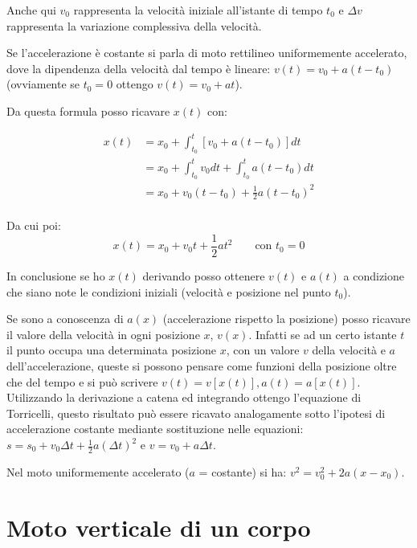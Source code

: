 \documentclass[class=book, crop=false, oneside, 12pt]{standalone}
\begin{document}
Anche qui \(v_0\) rappresenta la velocità iniziale all'istante di tempo
\(t_0\) e \(\Delta v\) rappresenta la variazione complessiva
della velocità.

Se l'accelerazione è costante si parla di moto rettilineo uniformemente
accelerato, dove la dipendenza della velocità dal tempo è lineare:
\(v(t) = v_0 + a(t-t_0)\) (ovviamente se \(t_0 = 0\) ottengo
\(v(t) = v_0 + at\)).

Da questa formula posso ricavare \(x(t)\) con:

\begin{equation}
  \begin{aligned}
    x(t) &= x_0 + \int_{t_0}^{t} [v_0 + a(t-t_0)] dt\\
         &= x_0 + \int_{t_0}^{t}v_0 dt+ \int_{t_0}^t a (t-t_0) dt\\
         &= x_0 + v_0(t-t_0) + \frac{1}{2} a(t-t_0)^2\\
  \end{aligned}
\end{equation}

Da cui poi:
\begin{equation}
  x(t) = x_0 + v_0 t + \frac {1} {2} a t^2 \qquad \text{con \(t_0=0\)}
\end{equation}

In conclusione se ho \(x(t)\) derivando posso ottenere \(v(t)\) e
\(a(t)\) a condizione che siano note le condizioni iniziali (velocità e
posizione nel punto \(t_0\)).

Se sono a conoscenza di \(a(x)\) (accelerazione rispetto la posizione)
posso ricavare il valore della velocità in ogni posizione \(x\),
\(v(x)\). Infatti se ad un certo istante \(t\) il punto occupa una
determinata posizione \(x\), con un valore \(v\) della velocità e \(a\)
dell'accelerazione, queste si possono pensare come funzioni della
posizione oltre che del tempo e si può scrivere
\(v(t) = v[x(t)], a(t)=a[x (t)]\). Utilizzando la derivazione a catena
ed integrando ottengo l'equazione di Torricelli, questo risultato può
essere ricavato analogamente sotto l'ipotesi di accelerazione costante
mediante sostituzione nelle equazioni:
\(s = s_0 + v_0\Delta t + \frac {1}{2} a(\Delta t)^2\) e
\(v = v_0 + a\Delta t\).

Nel moto uniformemente accelerato (\(a\) = costante) si ha:
\(v^2 = v_0^2 +2a (x-x_0)\).


\section{Moto verticale di un corpo }
\end{document}
